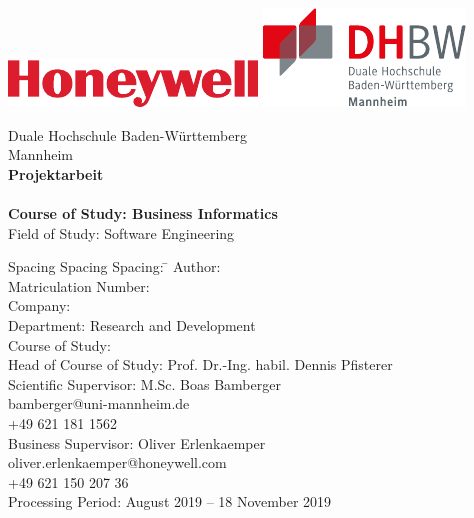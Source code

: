 \begin{titlepage}
\begin{minipage}{\textwidth}
		\vspace{-2cm}
		\noindent \includegraphics[scale=0.71]{img/firmenlogo.pdf} \hfill   \includegraphics{img/dhbwlogo.pdf}
\end{minipage}
\vspace{1em}
\sffamily
\begin{center}
	\textsf{\large{}Duale Hochschule Baden-W\"urttemberg\\[1.5mm] Mannheim}\\[2em]
	\textsf{\textbf{\Large{}Projektarbeit}}\\[3mm]
	\textsf{\textbf{\DerTitelDerArbeit}} \\[1.5cm]
	\textsf{\textbf{\Large{}Course of Study: Business Informatics}\\[3mm] \textsf{Field of Study: Software Engineering}}
	
\vfill

\begin{minipage}{\textwidth}

\begin{tabbing}
	Spacing Spacing Spacing: \hspace{0.85cm}\=\kill
	Author: \> \DerAutorDerArbeit \\[1.5mm]
	Matriculation Number:  \\[1.5mm]
	Company: \> \DerNameDerFirma  \\[1.5mm]
	Department: \> Research and Development \\[1.5mm]
	Course of Study: \> \DieKursbezeichnung \\[1.5mm]
	Head of Course of Study: \> Prof. Dr.-Ing. habil. Dennis Pfisterer  \\[1.5mm]
	Scientific Supervisor: \> M.Sc. Boas Bamberger  \\
	\> bamberger@uni-mannheim.de \\
	\> +49 621 181 1562 \\[1.5mm]
	Business Supervisor: \> Oliver Erlenkaemper \\
	\> oliver.erlenkaemper@honeywell.com \\
	\> +49 621 150 207 36 \\[1.5mm]
	Processing Period:  August 2019 -- 18 November 2019 
\end{tabbing}
\end{minipage}

\end{center}

\end{titlepage}